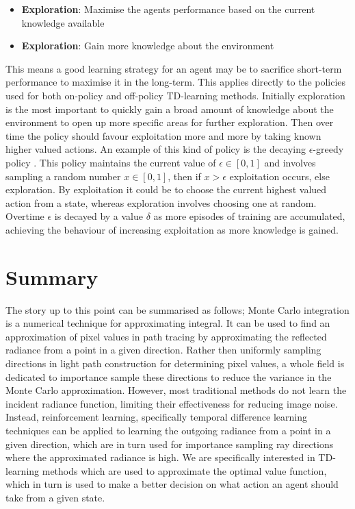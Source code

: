 \documentclass[../dissertation.tex]{subfiles}
\begin{document}
\begin{itemize}
\item \textbf{Exploration}: Maximise the agents performance based on the current knowledge available
\item \textbf{Exploration}: Gain more knowledge about the environment
\end{itemize}

This means a good learning strategy for an agent may be to sacrifice short-term performance to maximise it in the long-term. This applies directly to the policies used for both on-policy and off-policy TD-learning methods. Initially exploration is the most important to quickly gain a broad amount of knowledge about the environment to open up more specific areas for further exploration. Then over time the policy should favour exploitation more and more by taking known higher valued actions. An example of this kind of policy is the decaying $\epsilon$-greedy policy \cite{sutton2011reinforcement}. This policy maintains the current value of $\epsilon \in [0,1]$ and involves sampling a random number $x \in [0,1]$, then if $x > \epsilon$ exploitation occurs, else exploration. By exploitation it could be to choose the current highest valued action from a state, whereas exploration involves choosing one at random. Overtime $\epsilon$ is decayed by a value $\delta$ as more episodes of training are accumulated, achieving the behaviour of increasing exploitation as more knowledge is gained.

\section*{Summary}
The story up to this point can be summarised as follows; Monte Carlo integration is a numerical technique for approximating integral. It can be used to find an approximation of pixel values in path tracing by approximating the reflected radiance from a point in a given direction. Rather then uniformly sampling directions in light path construction for determining pixel values, a whole field is dedicated to importance sample these directions to reduce the variance in the Monte Carlo approximation. However, most traditional methods do not learn the incident radiance function, limiting their effectiveness for reducing image noise. Instead, reinforcement learning, specifically temporal difference learning techniques can be applied to learning the outgoing radiance from a point in a given direction, which are in turn used for importance sampling ray directions where the approximated radiance is high. We are specifically interested in TD-learning methods which are used to approximate the optimal value function, which in turn is used to make a better decision on what action an agent should take from a given state.
\end{document}

